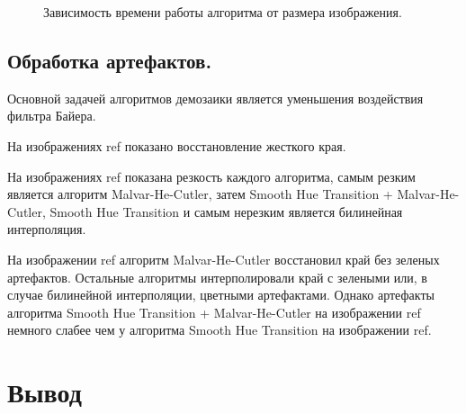 \begin{figure}[h]
	\centering
	\captionsetup{justification=centering}
	\caption{Зависимость времени работы алгоритма от размера изображения.}
	\label{plt:time_img}

\end{figure}

\subsection{Обработка артефактов.}

Основной задачей алгоритмов демозаики является уменьшения воздействия фильтра Байера.

На изображениях ref показано восстановление жесткого края.

На изображениях ref показана резкость каждого алгоритма, самым резким является алгоритм Malvar-He-Cutler, затем Smooth Hue Transition + Malvar-He-Cutler, Smooth Hue Transition и самым нерезким является билинейная интерполяция.

На изображении ref алгоритм Malvar-He-Cutler восстановил край без зеленых артефактов. Остальные алгоритмы интерполировали край с зелеными или, в случае билинейной интерполяции, цветными артефактами. Однако артефакты алгоритма Smooth Hue Transition + Malvar-He-Cutler на изображении ref немного слабее чем у алгоритма Smooth Hue Transition на изображении ref.

\section*{Вывод}

